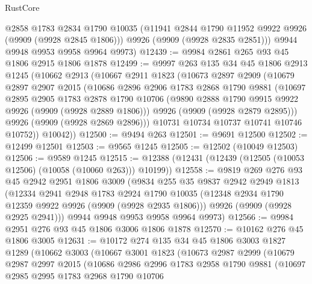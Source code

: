 \begin{lexlean}{RustCore}
\begin{coremodule}
        @2858
        @1783
        @2834
        @1790
        @10035
        (@11941 @2844 @1790 @11952 @9922 @9926 (@9909 (@9928 @2845 @1806)))
        @9926
        (@9909 (@9928 @2835 @2851)))
      @9944
      @9948
      @9953
      @9958
      @9964
      @9973)
@12439 := @9984 @2861 @265 @93 @45 @1806 @2915 @1806 @1878
@12499 := @9997
    @263
    @135
    @34
    @45
    @1806
    @2913
    @1245
    (@10662
      @2913
      (@10667
        @2911
        @1823
        (@10673
          @2897
          @2909
          (@10679
            @2897
            @2907
            @2015
            (@10686
              @2896
              @2906
              @1783
              @2868
              @1790
              @9881
              (@10697
                @2895
                @2905
                @1783
                @2878
                @1790
                @10706
                (@9890 @2888 @1790 @9915 @9922 @9926 (@9909 (@9928 @2889 @1806)))
                @9926
                (@9909 (@9928 @2879 @2895)))
              @9926
              (@9909 (@9928 @2869 @2896)))
            @10731
            @10734
            @10737
            @10741
            @10746
            @10752))
        @10042))
@12500 := @9494 @263
@12501 := @9691 @12500
@12502 := @12499 @12501
@12503 := @9565 @1245
@12505 := @12502 (@10049 @12503)
@12506 := @9589 @1245
@12515 := @12388 (@12431 (@12439 (@12505 (@10053 @12506) (@10058 (@10060 @263))) @10199))
@12558 := @9819
    @269
    @276
    @93
    @45
    @2942
    @2951
    @1806
    @3009
    (@9834
      @255
      @35
      @9837
      @2942
      @2949
      @1813
      (@12334
        @2941
        @2948
        @1783
        @2924
        @1790
        @10035
        (@12348 @2934 @1790 @12359 @9922 @9926 (@9909 (@9928 @2935 @1806)))
        @9926
        (@9909 (@9928 @2925 @2941)))
      @9944
      @9948
      @9953
      @9958
      @9964
      @9973)
@12566 := @9984 @2951 @276 @93 @45 @1806 @3006 @1806 @1878
@12570 := @10162 @276 @45 @1806 @3005
@12631 := @10172
    @274
    @135
    @34
    @45
    @1806
    @3003
    @1827
    @1289
    (@10662
      @3003
      (@10667
        @3001
        @1823
        (@10673
          @2987
          @2999
          (@10679
            @2987
            @2997
            @2015
            (@10686
              @2986
              @2996
              @1783
              @2958
              @1790
              @9881
              (@10697
                @2985
                @2995
                @1783
                @2968
                @1790
                @10706

\end{coremodule}
\end{lexlean}
